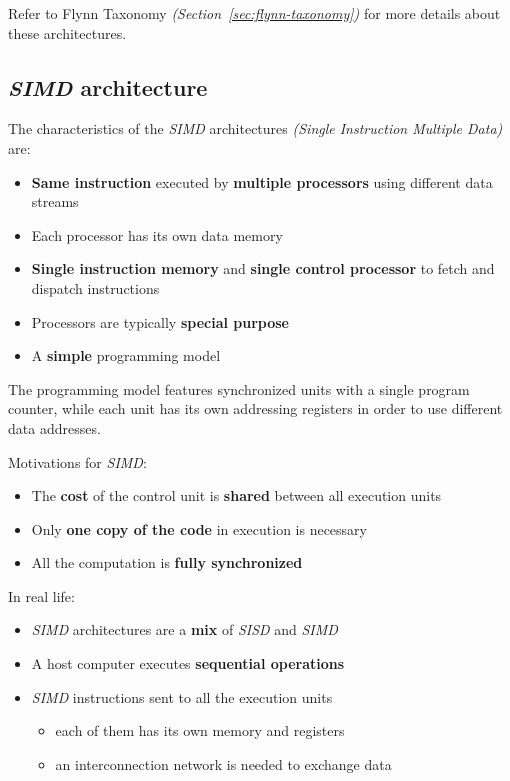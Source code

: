 \documentclass[english]{article}
\begin{document}
Refer to Flynn Taxonomy \textit{(Section~\ref{sec:flynn-taxonomy})} for more details about these architectures.

\subsection{\textit{SIMD} architecture}

The characteristics of the \textit{SIMD} architectures \textit{(Single Instruction Multiple Data)} are:

\begin{itemize}
  \item \textbf{Same instruction} executed by \textbf{multiple processors} using different data streams
  \item Each processor has its own data memory
  \item \textbf{Single instruction memory} and \textbf{single control processor} to fetch and dispatch instructions
  \item Processors are typically \textbf{special purpose}
  \item A \textbf{simple} programming model
\end{itemize}

The programming model features synchronized units with a single program counter, while each unit has its own addressing registers in order to use different data addresses.

\bigskip
Motivations for \textit{SIMD}:

\begin{itemize}
  \item The \textbf{cost} of the control unit is \textbf{shared} between all execution units
  \item Only\textbf{ one copy of the code} in execution is necessary
  \item All the computation is \textbf{fully synchronized}
\end{itemize}

In real life:

\begin{itemize}
  \item \textit{SIMD} architectures are a \textbf{mix} of \textit{SISD} and \textit{SIMD}
  \item A host computer executes \textbf{sequential operations}
  \item \textit{SIMD} instructions sent to all the execution units
        \begin{itemize}
          \item each of them has its own memory and registers
          \item an interconnection network is needed to exchange data
        \end{itemize}
\end{itemize}
\end{document}
